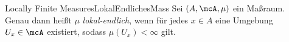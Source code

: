 \begin{mdef}{Locally Finite Measures}{LokalEndlichesMass}
    Sei $(A,\mcA,\mu)$ ein Maßraum. Genau dann heißt $\mu$ \emph{lokal-endlich}, wenn für jedes $x\in A$ eine Umgebung $U_x\in\mcA$ existiert, sodass $\mu(U_x) < \infty$ gilt.
\end{mdef}